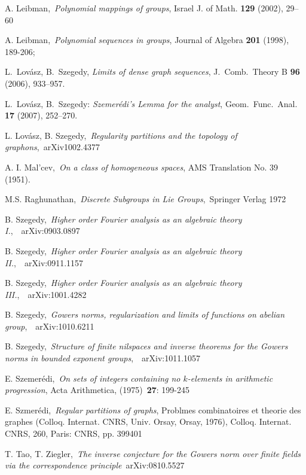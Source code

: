 \documentclass [11pt] {article}
\begin{document}
\begin{thebibliography}{99}
 A. Leibman,~{\it Polynomial mappings of groups}, Israel J. of Math. {\bf 129} (2002), 29--60

 A. Leibman,~{\it Polynomial sequences in groups}, Journal of Algebra {\bf 201} (1998), 189-206;

L.~Lov\'asz, B.~Szegedy, {\it Limits of dense graph sequences}, 
J.~Comb.\ Theory B {\bf 96}  (2006), 933--957.

L.~Lov\'asz, B.~Szegedy: {\it Szemer\'edi's Lemma for the analyst},
Geom.\ Func.\ Anal. {\bf 17} (2007), 252--270.

L. Lov\'asz, B. Szegedy,~{\it Regularity partitions and the topology of graphons},~arXiv1002.4377

A. I. Mal'cev,~{\it On a class of homogeneous spaces}, AMS Translation No. 39 (1951).

 M.S. Raghunathan,~{\it Discrete Subgroups in Lie Groups},~Springer Verlag 1972

B. Szegedy,~{\it Higher order Fourier analysis as an algebraic theory I.},~~arXiv:0903.0897

B. Szegedy,~{\it Higher order Fourier analysis as an algebraic theory II.},~~arXiv:0911.1157

B. Szegedy,~{\it Higher order Fourier analysis as an algebraic theory III.},~~arXiv:1001.4282

B. Szegedy,~{\it Gowers norms, regularization and limits of functions on abelian group},~~arXiv:1010.6211

B. Szegedy,~{\it Structure of finite nilspaces and inverse theorems for the Gowers norms in bounded exponent groups},~~arXiv:1011.1057

E. Szemer\'edi,~{\it On sets of integers containing no $k$-elements in arithmetic progression}, Acta Arithmetica, (1975)~{\bf 27}: 199-245

E. Szmer\'edi,~{\it Regular partitions of graphs}, Problmes combinatoires et theorie des graphes (Colloq. Internat. CNRS, Univ. Orsay, Orsay, 1976), Colloq. Internat. CNRS, 260, Paris: CNRS, pp. 399401

T. Tao, T. Ziegler,~{\it The inverse conjecture for the Gowers norm over finite fields via the correspondence principle}~arXiv:0810.5527


\end{thebibliography}
\end{document}
